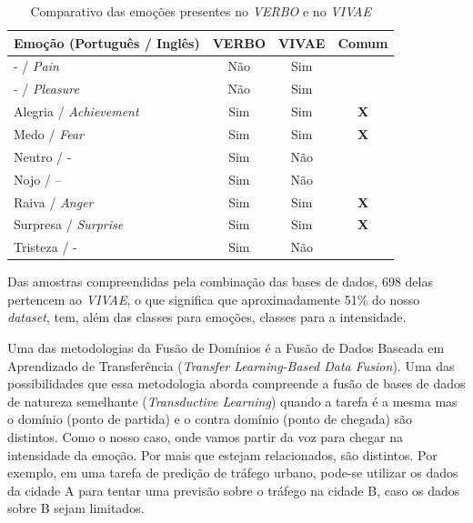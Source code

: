 \begin{table}[!ht]\label{table:verbovsvivae}
\centering
\caption{Comparativo das emoções presentes no \textit{VERBO} e no \textit{VIVAE}}
    \begin{tabular}{|l|c|c|c|}
    \hline
        Emoção (Português / Inglês) & VERBO & VIVAE & Comum  \\ \hline
        - / \textit{Pain} & Não & Sim &    \\ \hline
        - / \textit{Pleasure} & Não & Sim &    \\ \hline
        Alegria / \textit{Achievement} & Sim & Sim & \textbf{X}  \\ \hline
        Medo / \textit{Fear} & Sim & Sim & \textbf{X}  \\ \hline
        Neutro / - & Sim & Não &    \\ \hline
        Nojo / – & Sim & Não &    \\ \hline
        Raiva / \textit{Anger} & Sim & Sim & \textbf{X}  \\ \hline
        Surpresa / \textit{Surprise} & Sim & Sim & \textbf{X}  \\ \hline
        Tristeza / - & Sim & Não &    \\ \hline
    \end{tabular}
\end{table}

Das amostras compreendidas pela combinação das bases de dados, 698 delas pertencem ao \textit{VIVAE}, o que significa que aproximadamente 51\% do nosso \textit{dataset}, tem, além das classes para emoções, classes para a intensidade.

Uma das metodologias da Fusão de Domínios \cite{49} é a Fusão de Dados Baseada em Aprendizado de Transferência (\textit{Transfer Learning-Based Data Fusion}). Uma das possibilidades que essa metodologia aborda compreende a fusão de bases de dados de natureza semelhante (\textit{Transductive Learning}) quando a tarefa é a mesma mas o domínio (ponto de partida) e o contra domínio (ponto de chegada) são distintos. Como o nosso caso, onde vamos partir da voz para chegar na intensidade da emoção. Por mais que estejam relacionados, são distintos. Por exemplo, em uma tarefa de predição de tráfego urbano, pode-se utilizar os dados da cidade A para tentar uma previsão sobre o tráfego na cidade B, caso os dados sobre B sejam limitados. 

